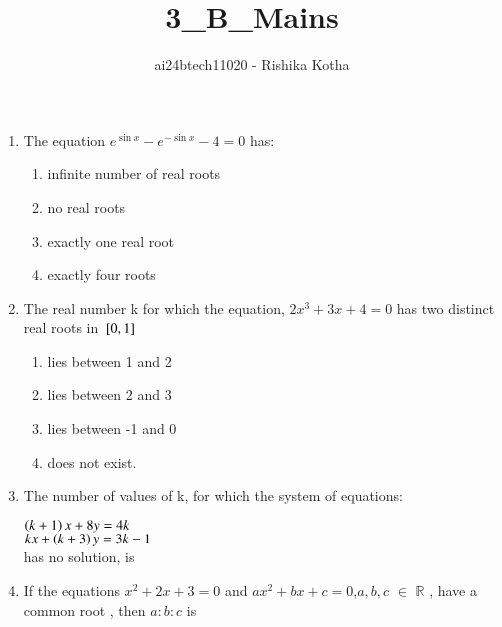 \documentclass[journal,12pt,twocolumn]{IEEEtran}
\theoremstyle{remark}
\begin{document}

\vspace{3cm}

\title{3\_B\_Mains}
\author{ai24btech11020 - Rishika Kotha}

\maketitle
\bigskip       
\renewcommand{\thefigure}{\theenumi}
\renewcommand{\thetable}{\theenumi}

\begin{enumerate}[start=24]
\item The equation $e^{\sin x}-e^{-\sin x}-4=0$ has:

	\hfill {}
	\begin{enumerate}[label=\alph*.]
	\item  infinite number of real roots
	\item  no real roots
	\item  exactly one real root
	\item  exactly four roots
	\end{enumerate}

\item The real number k for which the equation, $2x^3+3x+4=0$ has two distinct real roots in ${}\left[0,1\right]$

	\hfill {}
	\begin{enumerate}[label=\alph*.]
        \item  lies between 1 and 2
	\item  lies between 2 and 3
	\item  lies between -1 and 0
	\item  does not exist.
	\end{enumerate}
\item The number of values of k, for which the system of equations:

	\hfill {}
	$\left(k+1\right)x+8y=4k$\\
	$kx+\left(k+3\right)y=3k-1$\\
     has no solution, is\\
	\begin{enumerate}[label=\alph*.]
	\begin{multicols}{2}
	\item   infinite
	\item     1
	\item     2
	\item     3
	\end{multicols}
	\end{enumerate}
\item If the equations $x^2+2x+3=0$ and $ax^2+bx+c=0$,$a,b,c$ $\in$ $\mathbb{R}$ , have a common root , then $a:b:c$ is


\end{enumerate}
\end{document}
